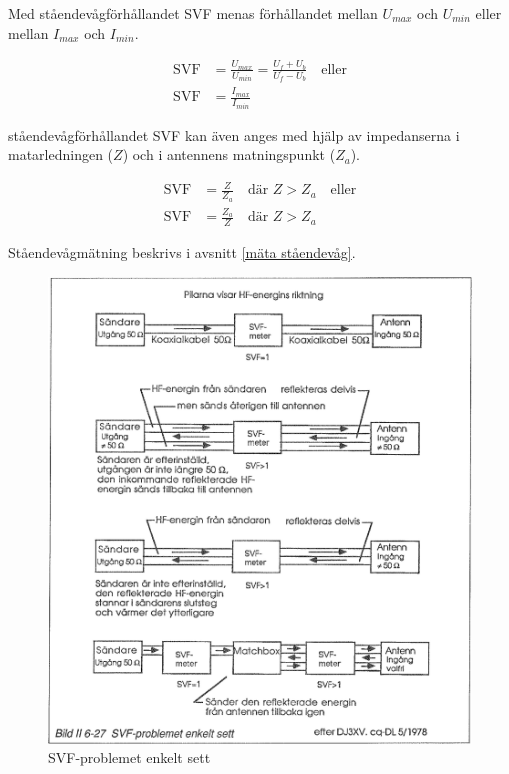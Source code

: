 Med ståendevågförhållandet SVF menas förhållandet mellan \(U_{max}\)
och \(U_{min}\) eller mellan \(I_{max}\) och \(I_{min}\).

\begin{align*}
  \text{SVF} &= \frac{U_{max}}{U_{min}} = \frac{U_f + U_b}{U_f - U_b} \quad
  \text{eller} \\
  \text{SVF} &= \frac{I_{max}}{I_{min}}
\end{align*}

ståendevågförhållandet SVF kan även anges med hjälp av impedanserna i
matarledningen (\(Z\)) och i antennens matningspunkt (\(Z_a\)).

\begin{align*}
  \text{SVF} &= \frac{Z}{Z_a} \quad \text{där } Z > Z_a \quad \text{eller} \\
  \text{SVF} &= \frac{Z_a}{Z} \quad \text{där } Z > Z_a
\end{align*}

Ståendevågmätning beskrivs i avsnitt \ref{mäta ståendevåg}.

\begin{figure}
  \includegraphics[width=\textwidth]{images/bild_2_6-27}
  \caption{SVF-problemet enkelt sett}
  \label{fig:bildII6-27}
\end{figure}

